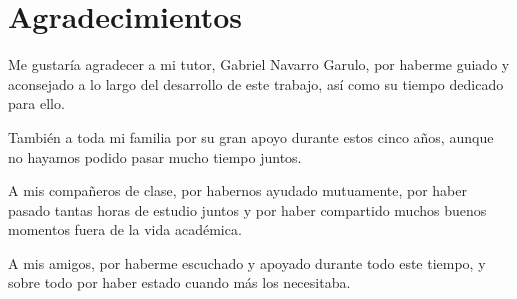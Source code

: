 
\chapter*{Agradecimientos}
\thispagestyle{empty}

Me gustaría agradecer a mi tutor, Gabriel Navarro Garulo, por haberme guiado y aconsejado a lo largo del desarrollo de este trabajo, así como su tiempo dedicado para ello.

También a toda mi familia por su gran apoyo durante estos cinco años, aunque no hayamos podido pasar mucho tiempo juntos.

A mis compañeros de clase, por habernos ayudado mutuamente, por haber pasado tantas horas de estudio juntos y por haber compartido muchos buenos momentos fuera de la vida académica.

A mis amigos, por haberme escuchado y apoyado durante todo este tiempo, y sobre todo por haber estado cuando más los necesitaba. 


\newpage